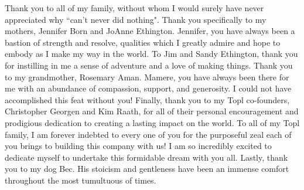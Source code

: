 \begin{acknowledge}
Thank you to all of my family, without whom I would surely have never appreciated why ``can't never did nothing".
Thank you specifically to my mothers, Jennifer Born and JoAnne Ethington.
Jennifer, you have always been a bastion of strength and resolve, qualities which I greatly admire and hope to embody as I make my way in the world.
To Jim and Sandy Ethington, thank you for instilling in me a sense of adventure and a love of making things.
Thank you to my grandmother, Rosemary Aman. 
Mamere, you have always been there for me with an abundance of compassion, support, and generosity. 
I could not have accomplished this feat without you!
Finally, thank you to my Topl co-founders, Christopher Georgen and Kim Raath, for all of their personal encouragement and prodigious dedication to creating a lasting impact on the world.
To all of my Topl family, I am forever indebted to every one of you for the purposeful zeal each of you brings to building this company with us!
I am so incredibly excited to dedicate myself to undertake this formidable dream with you all.
Lastly, thank you to my dog Bec.
His stoicism and gentleness have been an immense comfort throughout the most tumultuous of times.

\end{acknowledge}